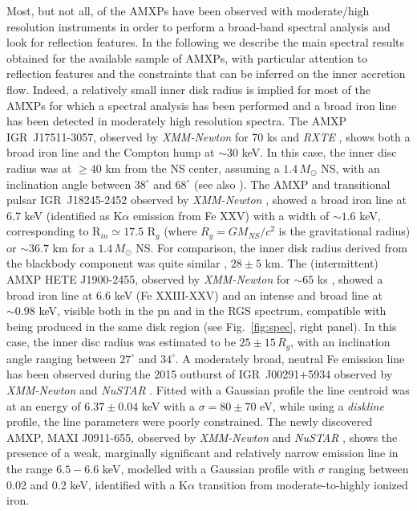\documentclass[graybox]{svmult}
\def \xmm {{\em XMM-Newton\xspace}}
\def \rxte {{\em RXTE\xspace}}
\def \nustar{{\em NuSTAR\xspace}}
\begin{document}
Most, but not all, of the AMXPs have been observed with moderate/high resolution instruments in order to perform a broad-band spectral analysis and look for reflection features. In the following we describe the main spectral results obtained for the available sample of AMXPs, with particular attention to reflection features and the constraints that can be inferred on the inner accretion flow. 
Indeed, a relatively small inner disk radius is implied for most of the AMXPs for which a spectral analysis has been performed and a broad iron line has been detected in moderately high resolution spectra. 
The AMXP IGR~J17511-3057, observed by \xmm{} for 70 ks and \rxte{} \cite{Papitto2010}, shows both a broad iron line and the Compton hump at $\sim 30$ keV. In this case, the inner disc radius was at $\ge 40$ km from the NS center, assuming a $1.4\, M_\odot$ NS, with an inclination angle between $38^\circ$ and $68^\circ$ (see also \cite{Papitto2016}). 
The AMXP and transitional pulsar IGR~J18245-2452 observed by \xmm{} \cite{Papitto2013b}, showed a broad iron line at 6.7 keV (identified as K$\alpha$ emission from Fe XXV) with a width of $\sim 1.6$ keV, corresponding to R$_{in} \simeq 17.5$ R$_g$ (where $R_g = G M_{NS}/c^2$ is the gravitational radius) or $\sim 36.7$ km for a $1.4\, M_\odot$ NS. For comparison, the inner disk radius derived from the blackbody component was quite similar , $28 \pm 5$ km. The (intermittent) AMXP HETE J1900-2455, observed by \xmm{} for $\sim 65$ ks \cite{Papitto2013a}, showed a broad iron line at 6.6 keV (Fe XXIII-XXV) and an intense and broad line at $\sim 0.98$ keV, visible both in the pn and in the RGS spectrum, compatible with being produced in the same disk region (see Fig.~\ref{fig:spec}, right panel). In this case, the inner disc radius was estimated to be $25 \pm 15\, R_g$, with an inclination angle ranging between $27^\circ$ and $34^\circ$.
A moderately broad, neutral Fe emission line has been observed during the 2015 outburst of IGR~J00291+5934 observed by \xmm{} and \nustar{} \cite{Sanna2017d}. Fitted with a Gaussian profile the line centroid was at an energy of $6.37 \pm 0.04$ keV with a $\sigma = 80 \pm 70$ eV, while using a {\it diskline} profile, the line parameters were poorly constrained. The newly discovered AMXP, MAXI J0911-655, observed by \xmm{} and \nustar{} \cite{Sanna2017d}, shows the presence of a weak, marginally significant and relatively narrow emission line in the range $6.5-6.6$ keV, modelled with a Gaussian profile with $\sigma$ ranging between 0.02 and 0.2 keV, identified with a K$\alpha$ transition from moderate-to-highly ionized iron.
\end{document}
